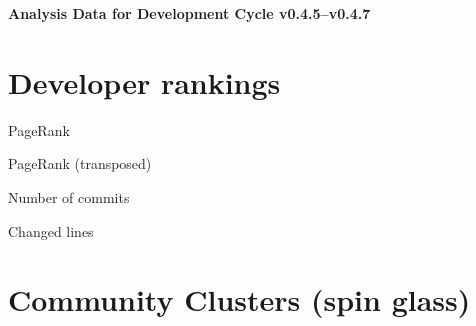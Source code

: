 \documentclass{article}
\begin{document}
\setlength{\parindent}{0pt}
\begin{center}
\begin{Large}
\textbf{Analysis Data for Development Cycle v0.4.5--v0.4.7}
\end{Large}
\end{center}
\section{Developer rankings}
\begin{small}\renewcommand{\tabcolsep}{1pt}
\begin{minipage}{0.5\linewidth}
PageRank\\

\end{minipage}%
\begin{minipage}{0.5\linewidth}
PageRank (transposed)\\

\end{minipage}

\renewcommand{\tabcolsep}{5pt}
\begin{minipage}{0.5\linewidth}
Number of commits\\

\end{minipage}%
\begin{minipage}{0.5\linewidth}
Changed lines\\

\end{minipage}
\end{small}
\newpage\section{Community Clusters (spin glass)}
\end{document}
